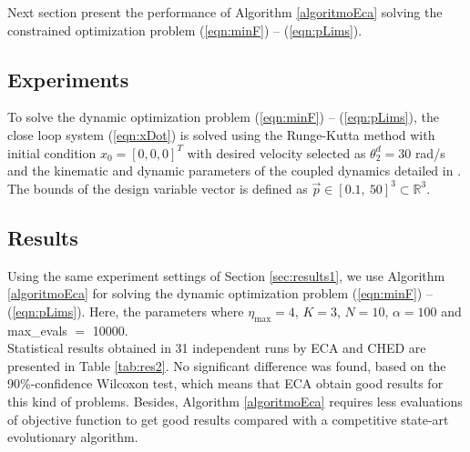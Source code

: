 \documentclass[12pt,letterpape]{article}
\begin{document}
Next section present the performance of Algorithm \ref{algoritmoEca} solving the
constrained optimization problem (\ref{eqn:minF}) -- (\ref{eqn:pLims}).

\subsection{Experiments} %

To solve the dynamic optimization problem (\ref{eqn:minF}) -- (\ref{eqn:pLims}),
the close loop system (\ref{eqn:xDot}) is solved using the Runge-Kutta method
\cite{dormand80} with initial condition $x_0 = [0,0,0]^T$ with desired
velocity selected as $\theta_2^d = 30$ rad/s and the kinematic and dynamic parameters
of the coupled dynamics detailed in \cite{calva13}. The bounds of the design
variable vector is defined as $\vec{p} \in [0.1, \ 50]^3 \subset \mathbb{R}^3 $.\\

\subsection{Results} %
\label{sub:results}

Using the same experiment settings of Section \ref{sec:results1}, we use Algorithm 
\ref{algoritmoEca} for solving the dynamic optimization problem (\ref{eqn:minF}) -- (\ref{eqn:pLims}).
Here, the parameters where $\eta_{\max} = 4$, $K = 3$, $N = 10$, $\alpha = 100$
and max\_evals $=$ 10000.\\

Statistical results obtained in 31 independent runs by ECA and CHED are presented
in Table \ref{tab:res2}. No significant difference was found, based on the
90\%-confidence Wilcoxon test, which means that ECA obtain good results for this
kind of problems. Besides, Algorithm \ref{algoritmoEca} requires less evaluations
of objective function to get good results compared with a competitive state-art
evolutionary algorithm.\\


\end{document}
